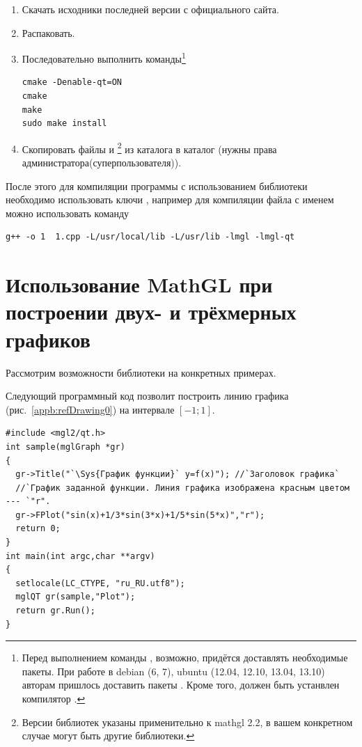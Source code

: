 \begin{enumerate}
\item Скачать исходники последней версии с официального сайта.
\item Распаковать.
\item Последовательно выполнить команды\footnote{Перед выполнением команды , возможно, придётся доставлять
необходимые пакеты. При работе в debian (6, 7), ubuntu (12.04, 12.10, 13.04, 13.10) авторам пришлось доставить  пакеты
. Кроме того, должен быть устанвлен компилятор .}
\begin{verbatim}
cmake -Denable-qt=ON
cmake
make
sudo make install
\end{verbatim}
\item Скопировать файлы  и \footnote{Версии библиотек  
указаны применительно к mathgl 2.2, в вашем конкретном случае могут быть другие библиотеки.} 
из каталога  в каталог  (нужны права администратора(суперпользователя)).
\end{enumerate}

После этого для компиляции программы с использованием библиотеки  необходимо использовать ключи , например для компиляции файла с именем  можно использовать команду
\begin{verbatim}
g++ -o 1  1.cpp -L/usr/local/lib -L/usr/lib -lmgl -lmgl-qt
\end{verbatim}


\section{Использование MathGL при построении двух- и трёхмерных графиков}
Рассмотрим возможности библиотеки на конкретных примерах.


Следующий программный код позволит построить линию графика (рис.~\ref{appb:refDrawing0}) на интервале $[-1;1]$.
\begin{lstlisting}
#include <mgl2/qt.h>
int sample(mglGraph *gr)
{
  gr->Title("`\Sys{График функции}` y=f(x)"); //`Заголовок графика`
  //`График заданной функции. Линия графика изображена красным цветом --- `"r".
  gr->FPlot("sin(x)+1/3*sin(3*x)+1/5*sin(5*x)","r");
  return 0;
}
int main(int argc,char **argv)
{
  setlocale(LC_CTYPE, "ru_RU.utf8");
  mglQT gr(sample,"Plot");
  return gr.Run();
}
\end{lstlisting}

